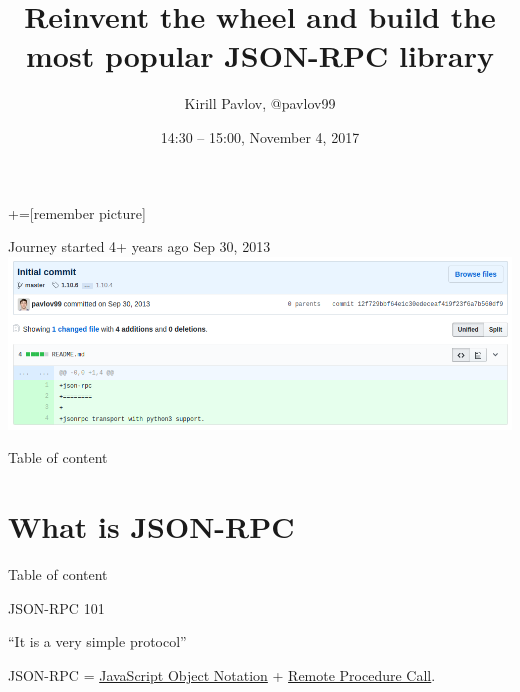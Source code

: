 \documentclass[unicode, notheorems, aspectratio=169]{beamer}
\title[JSON-RPC standard and library]{Reinvent the wheel and build the most popular JSON-RPC library}
\author[Kirill Pavlov <k@p99.io>]{Kirill Pavlov, \small{@pavlov99}}
\institute[]{Technical Recruiter, Terminal 1}
\date{14:30 -- 15:00, November 4, 2017}
\begin{document}
+=[remember picture]

\everymath{\displaystyle}


\begin{frame}
\titlepage
\end{frame}

\begin{frame}{Journey started 4+ years ago Sep 30, 2013}
\includegraphics[width=.95\paperwidth]{./images/json-rpc-initial-commit}
\end{frame}

\begin{frame}{Table of content}
    \tableofcontents
\end{frame}

\section{What is JSON-RPC}
\begin{frame}{Table of content}
	\tableofcontents[currentsection]
\end{frame}

\begin{frame}{JSON-RPC 101}
\begin{center}
\Huge ``It is a very simple protocol\footnotemark''
\\[5pt]
\end{center}

\vfill
\begin{center}
JSON-RPC = \href{https://en.wikipedia.org/wiki/JSON}{JavaScript Object Notation} + \href{https://en.wikipedia.org/wiki/Remote\_procedure\_call}{Remote Procedure Call}.
\end{center}

\end{frame}
\end{document}
